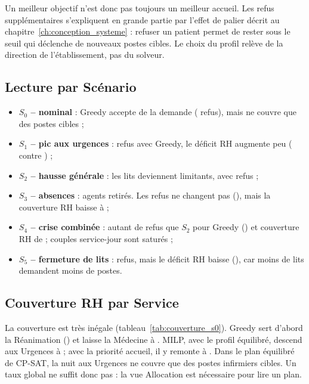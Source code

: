 Un meilleur objectif n'est donc pas toujours un meilleur accueil. Les refus supplémentaires s'expliquent en grande partie par l'effet de palier décrit au chapitre~\ref{ch:conception_systeme} : refuser un patient permet de rester sous le seuil qui déclenche de nouveaux postes cibles. Le choix du profil relève de la direction de l'établissement, pas du solveur.

\subsection{Lecture par Scénario}
\begin{itemize}
    \item \textbf{$S_0$ -- nominal} : Greedy accepte \CouvDemSzGreedy{} de la demande (\RefusSzGreedy{} refus), mais ne couvre que \CouvSzGreedy{} des postes cibles ;
    \item \textbf{$S_1$ -- pic aux urgences} : \RefusGreedySu{} refus avec Greedy, le déficit RH augmente peu (\DeficitGreedySu{} contre \DeficitSzGreedy{}) ;
    \item \textbf{$S_2$ -- hausse générale} : les lits deviennent limitants, avec \RefusGreedySd{} refus ;
    \item \textbf{$S_3$ -- absences} : \AbsentsSt{} agents retirés. Les refus ne changent pas (\RefusGreedySt{}), mais la couverture RH baisse à \CouvGreedySt{} ;
    \item \textbf{$S_4$ -- crise combinée} : autant de refus que $S_2$ pour Greedy (\RefusGreedySq{}) et couverture RH de \CouvGreedySq{} ; \SaturesSq{} couples service-jour sont saturés ;
    \item \textbf{$S_5$ -- fermeture de lits} : \RefusGreedySc{} refus, mais le déficit RH baisse (\DeficitGreedySc{}), car moins de lits demandent moins de postes.
\end{itemize}

\subsection{Couverture RH par Service}


La couverture est très inégale (tableau~\ref{tab:couverture_s0}). Greedy sert d'abord la Réanimation (\CouvSzGreedyRea{}) et laisse la Médecine à \CouvSzGreedyMed{}. MILP, avec le profil équilibré, descend aux Urgences à \CouvSzMilpUrg{} ; avec la priorité accueil, il y remonte à \CouvSzMilpUrgAccueil{}. Dans le plan équilibré de CP-SAT, la nuit aux Urgences ne couvre que \CouvNuitInfUrgCp{} des postes infirmiers cibles. Un taux global ne suffit donc pas : la vue Allocation est nécessaire pour lire un plan.

